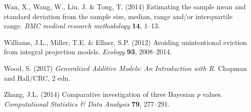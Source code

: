\documentclass[12pt]{article}
\begin{document}
\begin{spacing}{1.9}
\begin{thebibliography}{62}
Wan, X., Wang, W., Liu, J. \& Tong, T. (2014) Estimating the sample mean and
  standard deviation from the sample size, median, range and/or interquartile
  range. \emph{BMC medical research methodology} \textbf{14}, 1--13.

Williams, J.L., Miller, T.E. \& Ellner, S.P. (2012) Avoiding unintentional
  eviction from integral projection models. \emph{Ecology} \textbf{93},
  2008--2014.
  
  
Wood, S. (2017) \emph{Generalized Additive Models: An Introduction with R}.
  Chapman and Hall/CRC, 2 edn.

Zhang, J.L. (2014) Comparative investigation of three {B}ayesian $p$ values.
  \emph{Computational Statistics \& Data Analysis} \textbf{79}, 277--291.

\end{thebibliography}

\newpage 
\clearpage 
\setcounter{page}{1}
\setcounter{equation}{0}
\setcounter{figure}{0}
\setcounter{section}{0}
\setcounter{table}{0}
\renewcommand{\theequation}{S.\arabic{equation}}
\renewcommand{\thetable}{S-\arabic{table}}
\renewcommand{\thefigure}{S-\arabic{figure}}
\renewcommand{\thesection}{S.\arabic{section}}


\end{spacing} 
\end{document}
